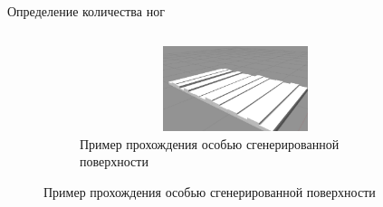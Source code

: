 \documentclass[aspectratio=169,xcolor=table,10pt]{beamer}
\begin{document}
\begin{frame}[t]{Определение количества ног}
\begin{columns}[T,onlytextwidth]
\begin{column}{0.39\textwidth}
\begin{figure}[H]
                \begin{subfigure}{0.99\textwidth}
                    \centering\includegraphics[height=2.5cm,width=1\textwidth,keepaspectratio]{../images/terrain_3.jpg}
                    \caption*{Пример прохождения особью сгенерированной поверхности}
                    \label{fig:../images/terrain_3.jpg}
                \end{subfigure}
            \end{figure}
        \end{column}
    \end{columns}
\end{frame}
\end{document}
